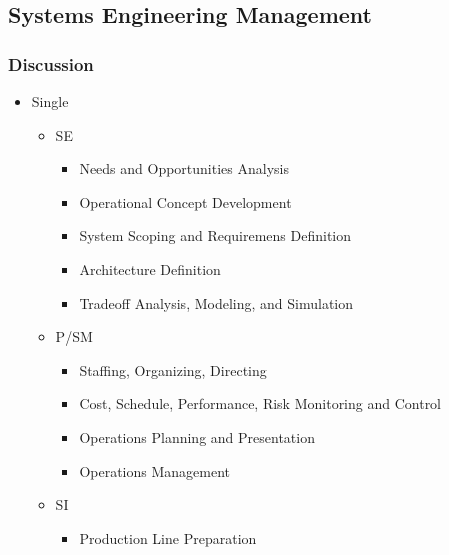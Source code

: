 \documentclass[letterpaper,10pt,english]{jupyterBook}
\begin{document}
\subsection{Systems Engineering Management}
\label{\detokenize{SE/sebok:systems-engineering-management}}

\subsubsection{Discussion}
\label{\detokenize{SE/sebok:discussion}}\begin{itemize}
\item {} 
\sphinxAtStartPar
Single
\begin{itemize}
\item {} 
\sphinxAtStartPar
SE
\begin{itemize}
\item {} 
\sphinxAtStartPar
Needs and Opportunities Analysis

\item {} 
\sphinxAtStartPar
Operational Concept Development

\item {} 
\sphinxAtStartPar
System Scoping and Requiremens Definition

\item {} 
\sphinxAtStartPar
Architecture Definition

\item {} 
\sphinxAtStartPar
Trade\sphinxhyphen{}off Analysis, Modeling, and Simulation

\end{itemize}

\item {} 
\sphinxAtStartPar
P/SM
\begin{itemize}
\item {} 
\sphinxAtStartPar
Staffing, Organizing, Directing

\item {} 
\sphinxAtStartPar
Cost, Schedule, Performance, Risk Monitoring and Control

\item {} 
\sphinxAtStartPar
Operations Planning and Presentation

\item {} 
\sphinxAtStartPar
Operations Management

\end{itemize}

\item {} 
\sphinxAtStartPar
SI
\begin{itemize}
\item {} 
\sphinxAtStartPar
Production Line Preparation


\end{itemize}
\end{itemize}
\end{itemize}
\end{document}
